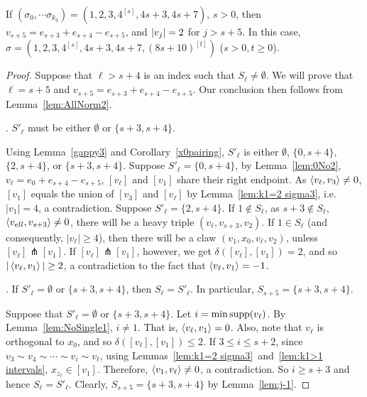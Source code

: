 \begin{prop}\label{lem:k1>1,2t+3}
		If $(\sigma_0, \cdots \sigma_{k_3})=(1,2,3,4^{[s]}, 4s+3,4s+7)$, $s>0$, then $v_{s+5}=e_{s+3}+e_{s+4}-e_{s+5}$, and $\lvert v_j \rvert = 2$ for $j>s+5$. In this case, $\sigma =  (1,2,3,4^{[s]}, 4s+3,4s+7, (8s+10)^{[t]})$ ($s>0,t \geq 0$). 
\end{prop}	

\begin{proof}
Suppose that $\ell>s+4$ is an index such that $S_{\ell}\ne\emptyset$. We will prove that $\ell=s+5$ and $v_{s+5}=e_{s+3}+e_{s+4}-e_{s+5}$. Our conclusion then follows from Lemma~\ref{lem:AllNorm2}.

. $S'_{\ell}$ must be either $\emptyset$ or $\{ s+3, s+4\}$.

Using Lemma~\ref{gappy3} and Corollary~\ref{x0pairing}, $S'_\ell$ is either $\emptyset$, $\{ 0, s+4\}$, $\{ 2, s+4\}$, or $\{ s+3, s+4\}$. Suppose $S'_{\ell}=\{ 0, s+4\}$, by Lemma~\ref{lem:0No2}, $v_{\ell}=e_0+e_{s+4}-e_{s+5}$, $[v_{\ell}]$ and $[v_1]$ share their right endpoint. As $\left\langle v_{\ell} , v_3 \right\rangle\neq 0$, $[v_1]$ equals the union of $[v_3]$ and $[v_{\ell}]$ by Lemma~\ref{lem:k1=2 sigma3}, i.e. $|v_1|=4$, a contradiction. Suppose $S'_{\ell}=\{ 2, s+4\}$. If $1\not \in S_{\ell}$, as $s+3\not\in S_{\ell}$, $\left\langle v_{ell} , v_{s+3} \right\rangle\ne0$, there will be a heavy triple $(v_{\ell}, v_{s+3}, v_2)$. If $1\in S_{\ell}$ (and consequently, $|v_{\ell}|\ge 4$), then there will be a claw $(v_1, x_0, v_{\ell}, v_2)$, unless $[v_{\ell}]\pitchfork [v_1]$. If $[v_{\ell}]\pitchfork [v_1]$, however, we get $\delta([v_{\ell}],[v_1])=2$, and so $|\left\langle v_{\ell} , v_1 \right\rangle|\ge 2$, a contradiction to the fact that $\left\langle v_{\ell} , v_1 \right\rangle=-1$.

. If $S'_{\ell}=\emptyset$ or $\{ s+3, s+4\}$, then $S_{\ell}=S'_{\ell}$. In particular, $S_{s+5}=\{ s+3, s+4\}$.

Suppose that $S'_{\ell}=\emptyset$ or $\{ s+3, s+4\}$. Let $i=\min\operatorname{supp}(v_{\ell})$.  By Lemma~\ref{lem:NoSingle1}, $i\ne1$. That is, $\left\langle v_\ell , v_1 \right\rangle=0$. Also, note that $v_\ell$ is orthogonal to $x_0$, and so $\delta([v_\ell], [v_1])\le 2$. If $3\le i\le s+2$, since $v_3\sim v_4\sim  \cdots\sim v_{i}\sim v_{\ell}$, using Lemmas~\ref{lem:k1=2 sigma3}~and~\ref{lem:k1>1 intervals}, $x_{z_{\ell}}\in [v_1]$. Therefore, $\left\langle v_1 , v_\ell \right\rangle\not = 0$, a contradiction. So $i\ge s+3$ and hence $S_{\ell}=S'_{\ell}$. Clearly, $S_{s+5}=\{ s+3, s+4\}$ by Lemma~\ref{lem:j-1}.


\end{proof}
